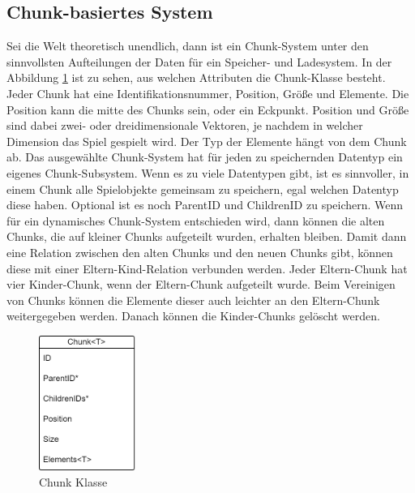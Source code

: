 \subsection{Chunk-basiertes System}
Sei die Welt theoretisch unendlich, dann ist ein Chunk-System unter den sinnvollsten Aufteilungen der Daten für ein Speicher- und Ladesystem. In der Abbildung \ref{fig:chunkClass} ist zu sehen, aus welchen Attributen die Chunk-Klasse besteht. Jeder Chunk hat eine Identifikationsnummer, Position, Größe und Elemente. Die Position kann die mitte des Chunks sein, oder ein Eckpunkt. Position und Größe sind dabei zwei- oder dreidimensionale Vektoren, je nachdem in welcher Dimension das Spiel gespielt wird. Der Typ der Elemente hängt von dem Chunk ab. Das ausgewählte Chunk-System hat für jeden zu speichernden Datentyp ein eigenes Chunk-Subsystem. Wenn es zu viele Datentypen gibt, ist es sinnvoller, in einem Chunk alle Spielobjekte gemeinsam zu speichern, egal welchen Datentyp diese haben. Optional ist es noch ParentID und ChildrenID zu speichern. Wenn für ein dynamisches Chunk-System entschieden wird, dann können die alten Chunks, die auf kleiner Chunks aufgeteilt wurden, erhalten bleiben. Damit dann eine Relation zwischen den alten Chunks und den neuen Chunks gibt, können diese mit einer Eltern-Kind-Relation verbunden werden. Jeder Eltern-Chunk hat vier Kinder-Chunk, wenn der Eltern-Chunk aufgeteilt wurde. Beim Vereinigen von Chunks können die Elemente dieser auch leichter an den Eltern-Chunk weitergegeben werden. Danach können die Kinder-Chunks gelöscht werden.

\begin{figure}[htp]
    \centering
    \includegraphics[width=0.28\textwidth]{images/Chunk.png}
    \caption{Chunk Klasse}
    \label{fig:chunkClass}
\end{figure}

